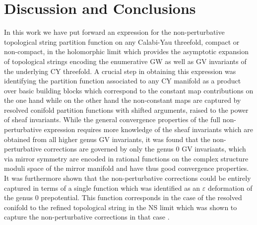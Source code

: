 \documentclass[a4paper,12pt,justification=centering]{article}
\numberwithin{equation}{section}
\theoremstyle{plain}%
\theoremstyle{definition}
\begin{document}
\section{Discussion and Conclusions}\label{sec:conclusions}
In this work we have put forward an expression for the non-perturbative topological string partition function on any Calabi-Yau threefold, compact or non-compact, in the holomorphic limit which provides the asymptotic expansion of topological strings encoding the enumerative GW as well as GV invariants of the underlying CY threefold. A crucial step in obtaining this expression was identifying the partition function associated to any CY manifold as a product over basic building blocks which correspond to the constant map contributions on the one hand while on the other hand the non-constant maps are captured by resolved conifold partition functions with shifted arguments, raised to the power of sheaf invariants. While the general convergence properties of the full non-perturbative expression requires more knowledge of the sheaf invariants which are obtained from all higher genus GV invariants, it was found that the non-perturbative corrections are governed by only the genus 0 GV invariants, which via mirror symmetry are encoded in rational functions on the complex structure moduli space of the mirror manifold and have thus good convergence properties. It was furthermore shown that the non-perturbative corrections could be entirely captured in terms of a single function which was identified as an $\varepsilon$ deformation of the genus 0 prepotential. This function corresponds in the case of the resolved conifold to the refined topological string in the NS limit which was shown to capture the non-perturbative corrections in that case \cite{Hatsuda:2015owa,Alim:2021ukq}.
\end{document}
